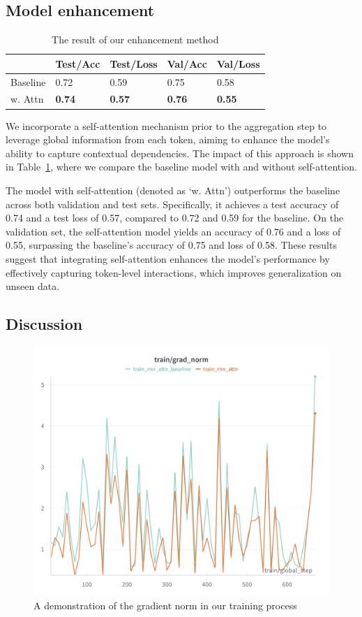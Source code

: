 \subsection{Model enhancement}

\begin{table}[bt]
\centering
\caption{The result of our enhancement method}
\label{tab:enhance}
\begin{tabular}{l|llll}
\toprule
         & Test/Acc      & Test/Loss     & Val/Acc       & Val/Loss      \\
\midrule
Baseline & 0.72          & 0.59          & 0.75          & 0.58          \\
w. Attn  & \textbf{0.74} & \textbf{0.57} & \textbf{0.76} & \textbf{0.55}
\end{tabular}
\end{table}

We incorporate a self-attention mechanism prior to the aggregation step to leverage global information from each token, aiming to enhance the model's ability to capture contextual dependencies. The impact of this approach is shown in Table~\ref{tab:enhance}, where we compare the baseline model with and without self-attention.

The model with self-attention (denoted as ‘w. Attn’) outperforms the baseline across both validation and test sets. Specifically, it achieves a test accuracy of 0.74 and a test loss of 0.57, compared to 0.72 and 0.59 for the baseline. On the validation set, the self-attention model yields an accuracy of 0.76 and a loss of 0.55, surpassing the baseline's accuracy of 0.75 and loss of 0.58. These results suggest that integrating self-attention enhances the model's performance by effectively capturing token-level interactions, which improves generalization on unseen data.

\subsection{Discussion}

\begin{figure}
    \centering
    \includegraphics[width=0.75\linewidth]{images/grad_norm.png}
    \caption{A demonstration of the gradient norm in our training process}
    \label{fig:grad-norm}
\end{figure}

